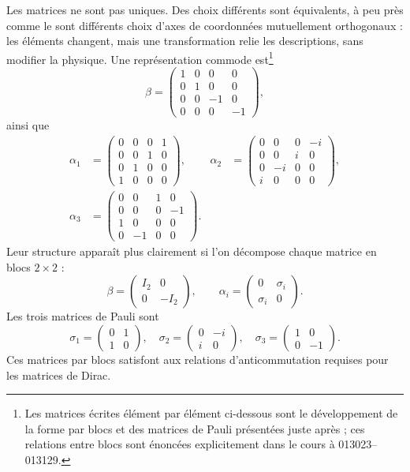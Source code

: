 Les matrices ne sont pas uniques. Des choix différents sont équivalents, à peu près comme le sont différents choix d’axes de coordonnées mutuellement orthogonaux : les éléments changent, mais une transformation relie les descriptions, sans modifier la physique. Une représentation commode est\footnote{Les matrices écrites élément par élément ci-dessous sont le développement de la forme par blocs et des matrices de Pauli présentées juste après ; ces relations entre blocs sont énoncées explicitement dans le cours à 013023--013129.}
\begin{equation}
\beta=
\begin{pmatrix}
1&0&0&0\\
0&1&0&0\\
0&0&-1&0\\
0&0&0&-1
\end{pmatrix},
\end{equation}
ainsi que
\begin{align}
\alpha_1&=
\begin{pmatrix}
0&0&0&1\\
0&0&1&0\\
0&1&0&0\\
1&0&0&0
\end{pmatrix},
&
\alpha_2&=
\begin{pmatrix}
0&0&0&-i\\
0&0&i&0\\
0&-i&0&0\\
i&0&0&0
\end{pmatrix},
\\[1ex]
\alpha_3&=
\begin{pmatrix}
0&0&1&0\\
0&0&0&-1\\
1&0&0&0\\
0&-1&0&0
\end{pmatrix}.
\end{align}
Leur structure apparaît plus clairement si l’on décompose chaque matrice en blocs \(2\times2\) :
\begin{equation}
\beta=
\begin{pmatrix}
I_2&0\\
0&-I_2
\end{pmatrix},
\qquad
\alpha_i=
\begin{pmatrix}
0&\sigma_i\\
\sigma_i&0
\end{pmatrix}.
\end{equation}
Les trois matrices de Pauli sont
\begin{equation}
\sigma_1=
\begin{pmatrix}
0&1\\
1&0
\end{pmatrix},
\quad
\sigma_2=
\begin{pmatrix}
0&-i\\
i&0
\end{pmatrix},
\quad
\sigma_3=
\begin{pmatrix}
1&0\\
0&-1
\end{pmatrix}.
\end{equation}
Ces matrices par blocs satisfont aux relations d’anticommutation requises pour les matrices de Dirac.

